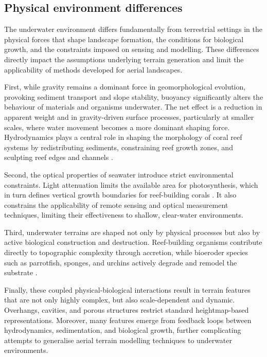 \subsection{Physical environment differences}
The underwater environment differs fundamentally from terrestrial settings in the physical forces that shape landscape formation, the conditions for biological growth, and the constraints imposed on sensing and modelling. These differences directly impact the assumptions underlying terrain generation and limit the applicability of methods developed for aerial landscapes.

First, while gravity remains a dominant force in geomorphological evolution, provoking sediment transport and slope stability, buoyancy significantly alters the behaviour of materials and organisms underwater. The net effect is a reduction in apparent weight and in gravity-driven surface processes, particularly at smaller scales, where water movement becomes a more dominant shaping force. Hydrodynamics plays a central role in shaping the morphology of coral reef systems by redistributing sediments, constraining reef growth zones, and sculpting reef edges and channels \cite{Lowe2015}.

Second, the optical properties of seawater introduce strict environmental constraints. Light attenuation limits the available area for photosynthesis, which in turn defines vertical growth boundaries for reef-building corals \cite{Huston1985}. It also constrains the applicability of remote sensing and optical measurement techniques, limiting their effectiveness to shallow, clear-water environments.

Third, underwater terrains are shaped not only by physical processes but also by active biological construction and destruction. Reef-building organisms contribute directly to topographic complexity through accretion, while bioeroder species such as parrotfish, sponges, and urchins actively degrade and remodel the substrate \cite{Perry2013}. %

Finally, these coupled physical-biological interactions result in terrain features that are not only highly complex, but also scale-dependent and dynamic. Overhangs, cavities, and porous structures restrict standard heightmap-based representations. Moreover, many features emerge from feedback loops between hydrodynamics, sedimentation, and biological growth, further complicating attempts to generalise aerial terrain modelling techniques to underwater environments. %


